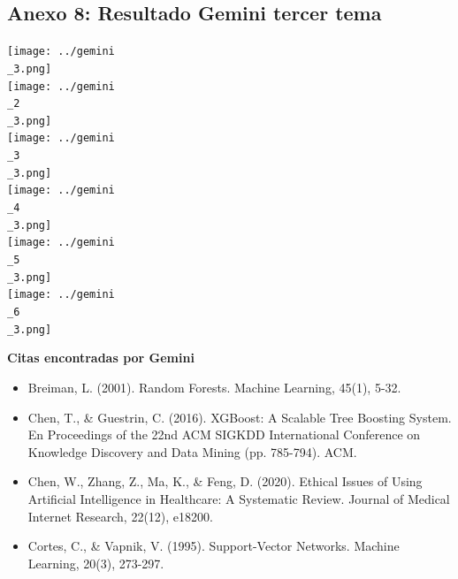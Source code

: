 \documentclass{article}
\begin{document}
\subsection{Anexo 8: Resultado Gemini tercer tema}
\begin{center}
    \texttt{[image: ../gemini\\\_3.png]}\\
    \texttt{[image: ../gemini\\\_2\\\_3.png]}\\
    \texttt{[image: ../gemini\\\_3\\\_3.png]}\\
    \texttt{[image: ../gemini\\\_4\\\_3.png]}\\
    \texttt{[image: ../gemini\\\_5\\\_3.png]}\\
    \texttt{[image: ../gemini\\\_6\\\_3.png]}\\
\end{center}
\textbf{Citas encontradas por Gemini}
\begin{itemize}
    \item Breiman, L. (2001). Random Forests. Machine Learning, 45(1), 5-32.
    \item Chen, T., \& Guestrin, C. (2016). XGBoost: A Scalable Tree Boosting System. En Proceedings of the 22nd ACM SIGKDD International Conference on Knowledge Discovery and Data Mining (pp. 785-794). ACM.
    \item Chen, W., Zhang, Z., Ma, K., \& Feng, D. (2020). Ethical Issues of Using Artificial Intelligence in Healthcare: A Systematic Review. Journal of Medical Internet Research, 22(12), e18200.
    \item Cortes, C., \& Vapnik, V. (1995). Support-Vector Networks. Machine Learning, 20(3), 273-297.
\end{itemize}

\newpage
\end{document}

